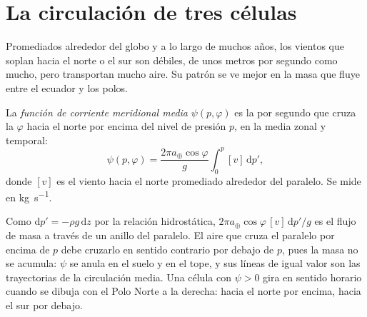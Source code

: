 
\section{La circulación de tres células}\label{sec:b1:atmospheric-circulation:cells}

Promediados alrededor del globo y a lo largo de muchos años, los vientos que soplan hacia el norte o el sur son débiles, de unos metros por segundo como mucho, pero transportan mucho aire. Su patrón se ve mejor en la masa que fluye entre el ecuador y los polos.

\begin{definition}\label{def:b1:atmospheric-circulation:streamfunction}
La \emph{función de corriente meridional media} $\psi(p, \varphi)$ es la  por segundo que cruza la 
$\varphi$ hacia el norte por encima del nivel de presión $p$, en la media zonal y temporal:
\[
  \psi(p, \varphi) = \frac{2\pi a_\oplus\cos\varphi}{g}\int_0^p [v]\,\mathrm dp' ,
\]
donde $[v]$ es el viento hacia el norte promediado alrededor del paralelo. Se mide en
\unit{kg.s^{-1}}.
\end{definition}

Como $\mathrm dp' = -\rho g\,\mathrm dz$ por la relación hidrostática, $2\pi a_\oplus
\cos\varphi\,[v]\,\mathrm dp'/g$ es el flujo de masa a través de un anillo del paralelo. El aire que cruza el paralelo por encima de $p$ debe cruzarlo en sentido contrario por debajo de $p$, pues la masa no se acumula: $\psi$ se anula en el suelo y en el tope, y sus líneas de igual valor son las trayectorias de la circulación media. Una célula con $\psi > 0$ gira en sentido horario cuando se dibuja con el Polo Norte a la derecha: hacia el norte por encima, hacia el sur por debajo.

